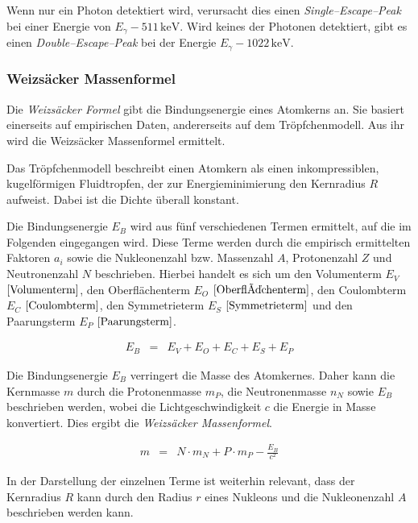 \documentclass[12pt,a4paper]{scrartcl}
\numberwithin{equation}{section} %
\newcommand{\pu}[1]{\ensuremath{\mathrm{#1}}}
\begin{document}
Wenn nur ein Photon detektiert wird, verursacht dies einen \emph{Single--Escape--Peak} bei einer Energie von
$E_\gamma - \pu{511\, keV}$. Wird keines der Photonen detektiert, gibt es einen \emph{Double--Escape--Peak} bei der Energie $E_\gamma - \pu{1022\, keV}$.

\hypertarget{weizsuxe4cker-massenformel}{%
	\subsubsection{Weizsäcker Massenformel}\label{weizsuxe4cker-massenformel}}
Die \emph{Weizsäcker Formel} gibt die Bindungsenergie eines Atomkerns an. Sie basiert einerseits auf empirischen Daten, andererseits auf dem Tröpfchenmodell. Aus ihr wird die Weizsäcker Massenformel ermittelt.

Das Tröpfchenmodell beschreibt einen Atomkern als einen inkompressiblen, kugelförmigen Fluidtropfen, der zur Energieminimierung den Kernradius $R$ aufweist. Dabei ist die Dichte überall konstant.

Die Bindungsenergie $E_B$ wird aus fünf verschiedenen Termen ermittelt, auf die im Folgenden eingegangen wird. Diese Terme werden durch die empirisch ermittelten Faktoren $a_i$ sowie die Nukleonenzahl bzw. Massenzahl $A$, Protonenzahl $Z$ und Neutronenzahl $N$ beschrieben. Hierbei handelt es sich um den Volumenterm $E_V$ $\eqref{Volumenterm}$, den Oberflächenterm $E_O$ $\eqref{Oberflächenterm}$, den Coulombterm $E_C$ $\eqref{Coulombterm}$, den Symmetrieterm $E_S$ $\eqref{Symmetrieterm}$ und den Paarungsterm $E_P$ $\eqref{Paarungsterm}$.

\begin{eqnarray}
	E_B &=& E_V + E_O + E_C + E_S + E_P
\end{eqnarray}

\noindent
Die Bindungsenergie $E_B$ verringert die Masse des Atomkernes. Daher kann die Kernmasse $m$ durch die Protonenmasse $m_P$, die Neutronenmasse $n_N$ sowie $E_B$ beschrieben werden, wobei die Lichtgeschwindigkeit $c$ die Energie in Masse konvertiert. Dies ergibt die \emph{Weizsäcker Massenformel}.

\begin{eqnarray}
	m &=& N\cdot m_N + P\cdot m_P - \frac{E_B}{c^2} \label{eq:Massenformel}
\end{eqnarray}

\noindent
In der Darstellung der einzelnen Terme ist weiterhin relevant, dass der Kernradius $R$ kann durch den Radius $r$ eines Nukleons und die Nukleonenzahl $A$ beschrieben werden kann.
\end{document}
